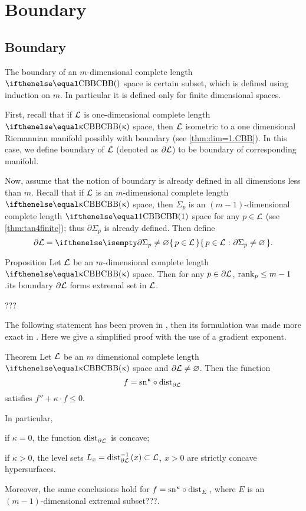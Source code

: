 \chapter{Boundary}


\section{Boundary}\label{sec:bry}

The boundary of an $m$-dimensional complete length $\Alex{}$ space is certain subset,
which is defined using induction on $m$.
In particular it is defined only for finite dimensional spaces.

First, recall that if $\mathcal{L}$ is one-dimensional complete length $\Alex\kappa$ space, then $\mathcal{L}$ isometric to a one dimensional Riemannian manifold possibly with boundary (see \ref{thm:dim=1.CBB}).
In this case, we define boundary of $\mathcal{L}$ (denoted as $\partial \mathcal{L}$) to be boundary of corresponding manifold.

Now, assume that the notion of boundary is already defined in all dimensions less than $m$.
Recall that if $\mathcal{L}$ is an $m$-dimensional complete length $\Alex\kappa$ space, then $\Sigma_p$ is an $(m-1)$-dimensional complete length $\Alex1$ space for any $p\in \spc{L}$ (see \ref{thm:tan4finite});
thus $\partial\Sigma_p$ is already defined.
Then define 
\[\partial \spc{L}=\set{p\in \spc{L}}{\partial\Sigma_p\not=\emptyset}.\]


\begin{thm}{Proposition}
Let $\mathcal{L}$ be an $m$-dimensional complete length $\Alex\kappa$ space.
Then for any $p\in\partial\spc{L}$, $\rank_p\le m-1$.its boundary $\partial \mathcal{L}$ forms extremal set in $\mathcal{L}$. 
\end{thm}

???\qeds


The following statement has been proven in \cite{perelman:spaces2}, then its
formulation was made more exact in \cite{alexander-bishop:fk}. 
Here we give a simplified proof with the use of a gradient exponent.

\begin{thm}{Theorem} \label{thm:dist-to-bry} 
Let $\mathcal{L}$ be an $m$ dimensional complete length $\Alex\kappa$ space and
$\partial \mathcal{L}\not=\varnothing$.
Then the function 
\[f=\sn\kappa\circ\distfun{\partial \spc{L}}{}{}\] 
satisfies $f''+\kappa\cdot  f\le 0$.

In particular,
\begin{subthm}{} if $\kappa=0$, the function $\mathop{\rm dist}\nolimits_{\partial \mathcal{L}}^{{}}{}{}$ is concave;
\end{subthm}

\begin{subthm}{} if $\kappa>0$, the level sets $L_x=\distfun[-1]{\partial \spc{L}}{}{}(x)\subset \spc{L}$, $x>0$
are strictly concave hypersurfaces.
\end{subthm}

Moreover, the same conclusions hold for $f=\sn\kappa\circ\distfun{E}{}{}$, where $E$ is an $(m-1)$-dimensional extremal subset???.
\end{thm}

